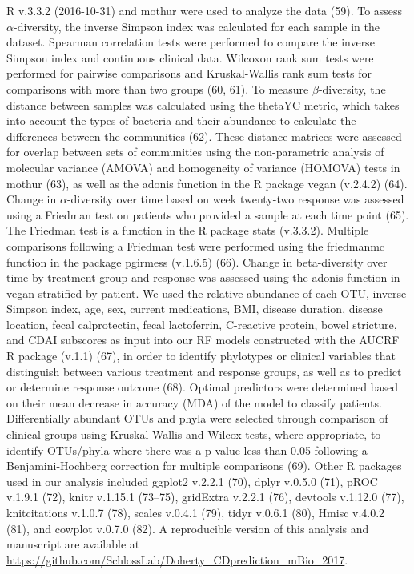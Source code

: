 \documentclass[11pt,]{article}
\begin{document}
R v.3.3.2 (2016-10-31) and mothur were used to analyze the data (59). To
assess \({\alpha}\)-diversity, the inverse Simpson index was calculated
for each sample in the dataset. Spearman correlation tests were
performed to compare the inverse Simpson index and continuous clinical
data. Wilcoxon rank sum tests were performed for pairwise comparisons
and Kruskal-Wallis rank sum tests for comparisons with more than two
groups (60, 61). To measure \({\beta}\)-diversity, the distance between
samples was calculated using the thetaYC metric, which takes into
account the types of bacteria and their abundance to calculate the
differences between the communities (62). These distance matrices were
assessed for overlap between sets of communities using the
non-parametric analysis of molecular variance (AMOVA) and homogeneity of
variance (HOMOVA) tests in mothur (63), as well as the adonis function
in the R package vegan (v.2.4.2) (64). Change in \({\alpha}\)-diversity
over time based on week twenty-two response was assessed using a
Friedman test on patients who provided a sample at each time point (65).
The Friedman test is a function in the R package stats (v.3.3.2).
Multiple comparisons following a Friedman test were performed using the
friedmanmc function in the package pgirmess (v.1.6.5) (66). Change in
beta-diversity over time by treatment group and response was assessed
using the adonis function in vegan stratified by patient. We used the
relative abundance of each OTU, inverse Simpson index, age, sex, current
medications, BMI, disease duration, disease location, fecal
calprotectin, fecal lactoferrin, C-reactive protein, bowel stricture,
and CDAI subscores as input into our RF models constructed with the
AUCRF R package (v.1.1) (67), in order to identify phylotypes or
clinical variables that distinguish between various treatment and
response groups, as well as to predict or determine response outcome
(68). Optimal predictors were determined based on their mean decrease in
accuracy (MDA) of the model to classify patients. Differentially
abundant OTUs and phyla were selected through comparison of clinical
groups using Kruskal-Wallis and Wilcox tests, where appropriate, to
identify OTUs/phyla where there was a p-value less than 0.05 following a
Benjamini-Hochberg correction for multiple comparisons (69). Other R
packages used in our analysis included ggplot2 v.2.2.1 (70), dplyr
v.0.5.0 (71), pROC v.1.9.1 (72), knitr v.1.15.1 (73--75), gridExtra
v.2.2.1 (76), devtools v.1.12.0 (77), knitcitations v.1.0.7 (78), scales
v.0.4.1 (79), tidyr v.0.6.1 (80), Hmisc v.4.0.2 (81), and cowplot
v.0.7.0 (82). A reproducible version of this analysis and manuscript are
available at
\url{https://github.com/SchlossLab/Doherty_CDprediction_mBio_2017}.
\end{document}
